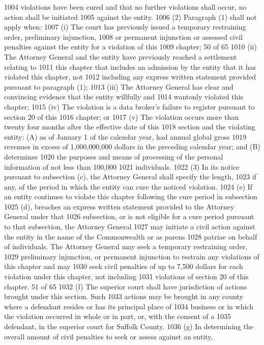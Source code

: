 1004 violations have been cured and that no further violations shall occur, no action shall be initiated
1005 against the entity.
1006 (2) Paragraph (1) shall not apply when:
1007 (i) The court has previously issued a temporary restraining order, preliminary injunction,
1008 or permanent injunction or assessed civil penalties against the entity for a violation of this
1009 chapter;
50 of 65
1010 (ii) The Attorney General and the entity have previously reached a settlement relating to
1011 this chapter that includes an admission by the entity that it has violated this chapter, not
1012 including any express written statement provided pursuant to paragraph (1);
1013 (iii) The Attorney General has clear and convincing evidence that the entity willfully and
1014 wantonly violated this chapter;
1015 (iv) The violation is a data broker’s failure to register pursuant to section 20 of this
1016 chapter; or
1017 (v) The violation occurs more than twenty four months after the effective date of this
1018 section and the violating entity: (A) as of January 1 of the calendar year, had annual global gross
1019 revenues in excess of 1,000,000,000 dollars in the preceding calendar year; and (B) determines
1020 the purposes and means of processing of the personal information of not less than 100,000
1021 individuals.
1022 (3) In its notice pursuant to subsection (c), the Attorney General shall specify the length,
1023 if any, of the period in which the entity can cure the noticed violation.
1024 (e) If an entity continues to violate this chapter following the cure period in subsection
1025 (d), breaches an express written statement provided to the Attorney General under that
1026 subsection, or is not eligible for a cure period pursuant to that subsection, the Attorney General
1027 may initiate a civil action against the entity in the name of the Commonwealth or as parens
1028 patriae on behalf of individuals. The Attorney General may seek a temporary restraining order,
1029 preliminary injunction, or permanent injunction to restrain any violations of this chapter and may
1030 seek civil penalties of up to 7,500 dollars for each violation under this chapter, not including
1031 violations of section 20 of this chapter.
51 of 65
1032 (f) The superior court shall have jurisdiction of actions brought under this section. Such
1033 actions may be brought in any county where a defendant resides or has its principal place of
1034 business or in which the violation occurred in whole or in part, or, with the consent of a
1035 defendant, in the superior court for Suffolk County.
1036 (g) In determining the overall amount of civil penalties to seek or assess against an entity,
